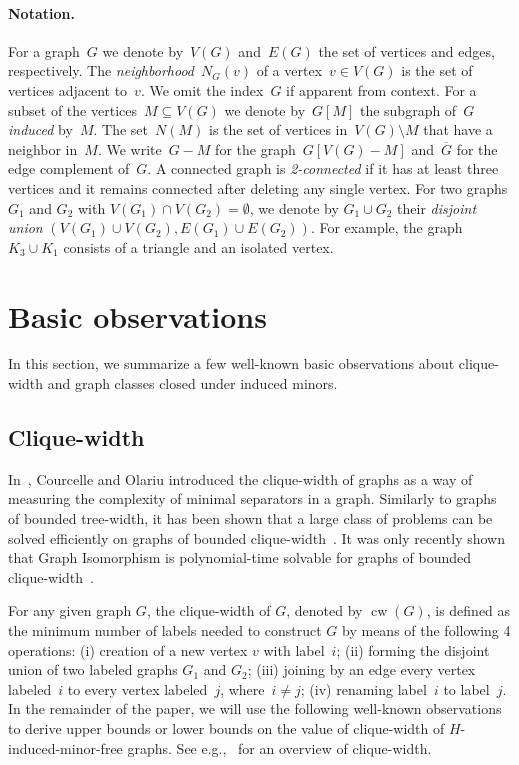 \documentclass[envcountsame,envcountsect,11pt,a4paper]{llncs}
\DeclareMathOperator{\cw}{cw}
\begin{document}
\paragraph{Notation.}
For a graph~$G$ we denote by~$V(G)$ and~$E(G)$ the set of vertices and edges, respectively.
The \emph{neighborhood}~$N_G(v)$ of a vertex~$v\in V(G)$ is the set of vertices adjacent to~$v$.
We omit the index~$G$ if apparent from context.
For a subset of the vertices~$M\subseteq V(G)$ we denote by~$G[M]$ the subgraph of~$G$ \emph{induced} by~$M$.
The set~$N(M)$ is the set of vertices in~$V(G)\setminus M$ that have a neighbor in~$M$.
We write~$G-M$ for the graph~$G[V(G)-M]$ and~$\overline{G}$ for the edge complement of~$G$.
A connected graph is \emph{2-connected} if it has at least three vertices and
it remains connected after deleting any single vertex.
For two graphs $G_{1}$ and $G_{2}$ with $V(G_{1}) \cap V(G_{2}) = \emptyset$,
we denote by $G_{1} \cup G_{2}$ their \emph{disjoint union} $(V(G_{1}) \cup V(G_{2}), E(G_{1}) \cup E(G_{2}))$.
For example, the graph $K_{3} \cup K_{1}$ consists of a triangle and an isolated vertex.




\section{Basic observations}\label{sec:basic:obs}

In this section, we summarize a few well-known basic observations about clique-width and graph classes closed under induced minors.

\subsection{Clique-width}

In~\cite{CourcelleOlariu2000}, Courcelle and Olariu introduced the clique-width of graphs as a way of measuring the complexity of minimal
separators in a graph. Similarly to graphs of bounded tree-width, it has been shown that a large class of problems can be solved efficiently
on graphs of bounded clique-width~\cite{CMR00}.
It was only recently shown that {\sc Graph Isomorphism} is polynomial-time solvable for graphs of bounded clique-width~\cite{rankwidth}.

For any given graph $G$, the clique-width of $G$, denoted by $\cw(G)$, is defined as the minimum number of labels needed to construct $G$ by
means of the following 4 operations: (i) creation of a new vertex $v$ with label~$i$; (ii) forming the disjoint union of two labeled graphs
$G_1$ and $G_2$; (iii) joining by an edge every vertex labeled~$i$ to every vertex labeled~$j$, where~$i \neq j$; (iv) renaming label~$i$ to
label~$j$. In the remainder of the paper, we will use the following well-known observations to derive upper bounds or lower bounds on
the value of clique-width of $H$-induced-minor-free graphs. See e.g.,~\cite{HOSG08} for an overview of clique-width.
\end{document}
